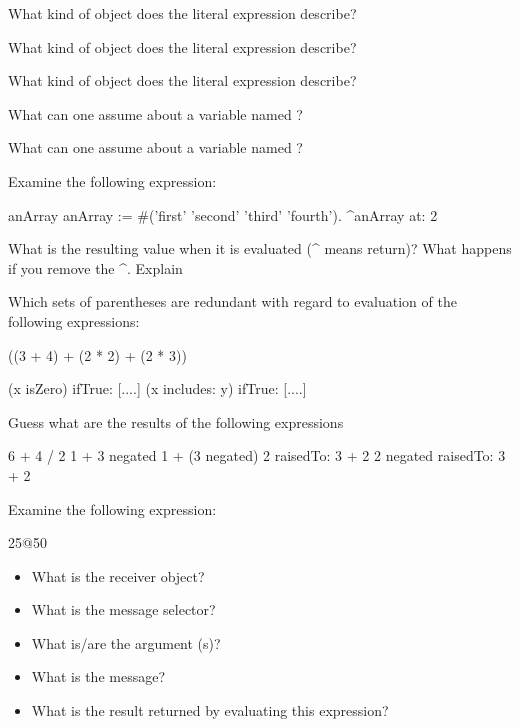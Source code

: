 \exercise What kind of object does the literal expression  describe?

\exercise What kind of object does the literal expression  describe?

\exercise What kind of object does the literal expression  describe?

\exercise What can one assume about a variable named ?

\exercise What can one assume about a variable named ?

\exercise Examine the following expression:

\begin{code}
\ttt{|} anArray \ttt{|}
anArray := #('first' 'second' 'third' 'fourth').
^anArray at: 2
\end{code}

What is the resulting value when it is evaluated (\^{ } means return)?
What happens if you remove the \^{ }. Explain

\exercise Which sets of parentheses are redundant with regard to
evaluation of the following expressions:

\begin{code}
((3 + 4) + (2 * 2) + (2 * 3))

(x isZero)
   ifTrue: [....]
(x includes: y)
   ifTrue: [....]
\end{code}

\exercise Guess what are the results of the following expressions

\begin{code}
6 + 4 / 2
1 + 3 negated
1 + (3 negated)
2 raisedTo: 3 + 2
2 negated raisedTo: 3 + 2
\end{code}

\exercise Examine the following expression:
\begin{code}
25@50
\end{code}
\begin{itemize}
\item What is the receiver object?
\item What is the message selector?
\item What is/are the argument (s)?
\item What is the message?
\item What is the result returned by evaluating this expression?
\end{itemize}

